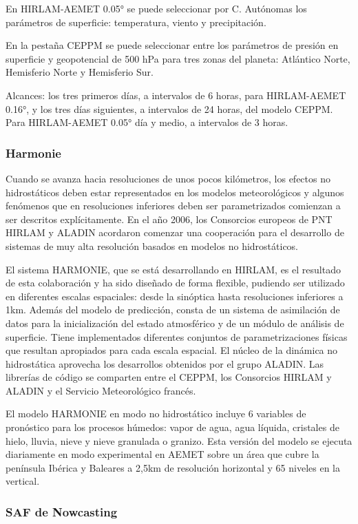 \documentclass[11pt]{article}
\begin{document}
En HIRLAM-AEMET 0.05° se puede seleccionar por C. Autónomas los
parámetros de superficie: temperatura, viento y precipitación.

En la pestaña CEPPM se puede seleccionar entre los parámetros de
presión en superficie y geopotencial de 500 hPa para tres zonas
del planeta: Atlántico Norte, Hemisferio Norte y Hemisferio Sur.

Alcances: los tres primeros días, a intervalos de 6 horas, para
HIRLAM-AEMET 0.16°, y los tres días siguientes, a intervalos de 24
horas, del modelo CEPPM. Para HIRLAM-AEMET 0.05° día y medio, a
intervalos de 3 horas.
\subsubsection{Harmonie}
\label{sec-2-5-2}
Cuando se avanza hacia resoluciones de unos pocos kilómetros, los
efectos no hidrostáticos deben estar representados en los modelos
meteorológicos y algunos fenómenos que en resoluciones inferiores
deben ser parametrizados comienzan a ser descritos
explícitamente. En el año 2006, los Consorcios europeos de PNT
HIRLAM y ALADIN acordaron comenzar una cooperación para el
desarrollo de sistemas de muy alta resolución basados en modelos
no hidrostáticos.

El sistema HARMONIE, que se está desarrollando en HIRLAM, es el
resultado de esta colaboración y ha sido diseñado de forma
flexible, pudiendo ser utilizado en diferentes escalas espaciales:
desde la sinóptica hasta resoluciones inferiores a 1km. Además del
modelo de predicción, consta de un sistema de asimilación de datos
para la inicialización del estado atmosférico y de un módulo de
análisis de superficie. Tiene implementados diferentes conjuntos
de parametrizaciones físicas que resultan apropiados para cada
escala espacial. El núcleo de la dinámica no hidrostática
aprovecha los desarrollos obtenidos por el grupo ALADIN. Las
librerías de código se comparten entre el CEPPM, los Consorcios
HIRLAM y ALADIN y el Servicio Meteorológico francés.

El modelo HARMONIE en modo no hidrostático incluye 6 variables de
pronóstico para los procesos húmedos: vapor de agua, agua líquida,
cristales de hielo, lluvia, nieve y nieve granulada o
granizo. Esta versión del modelo se ejecuta diariamente en modo
experimental en AEMET sobre un área que cubre la península Ibérica
y Baleares a 2,5km de resolución horizontal y 65 niveles en la
vertical.
\subsubsection{SAF  de Nowcasting}
\label{sec-2-5-3}
\end{document}

